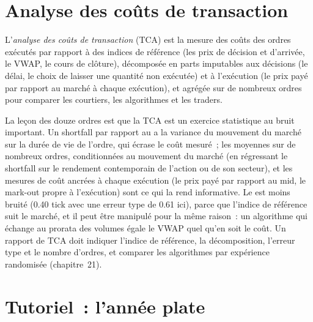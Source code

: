 \section{Analyse des coûts de transaction}

\begin{definition}\label{def:rs:measuring-market-making-and-execution:tca}
L'\emph{analyse des coûts de transaction} (TCA) est la mesure des coûts des ordres exécutés par rapport à des indices de référence (les prix de décision et
d'arrivée, le VWAP, le cours de clôture), décomposée en parts imputables aux décisions (le délai, le choix de laisser une quantité non exécutée) et à l'exécution (le prix payé
par rapport au marché à chaque exécution), et agrégée sur de nombreux ordres pour comparer les courtiers, les algorithmes et les traders.
\end{definition}

La leçon des douze ordres est que la TCA est un exercice statistique au bruit important. Un shortfall par rapport au  a la variance du mouvement du marché
sur la durée de vie de l'ordre, qui écrase le coût mesuré~; les moyennes sur de nombreux ordres, conditionnées au mouvement du marché (en régressant le shortfall sur le
rendement contemporain de l'action ou de son secteur), et les mesures de coût ancrées à chaque exécution (le prix payé par rapport au mid, le mark-out propre à l'exécution) sont ce qui
la rend informative. Le  est moins bruité (0.40 tick avec une erreur type de 0.61 ici), parce que l'indice de référence suit le marché, et il peut être manipulé
pour la même raison~: un algorithme qui échange au prorata des volumes égale le VWAP quel qu'en soit le coût. Un rapport de TCA doit indiquer l'indice de référence, la décomposition,
l'erreur type et le nombre d'ordres, et comparer les algorithmes par expérience randomisée (chapitre~21).

\section{Tutoriel~: l'année plate}\label{tut:rs:measuring-market-making-and-execution:tut}

